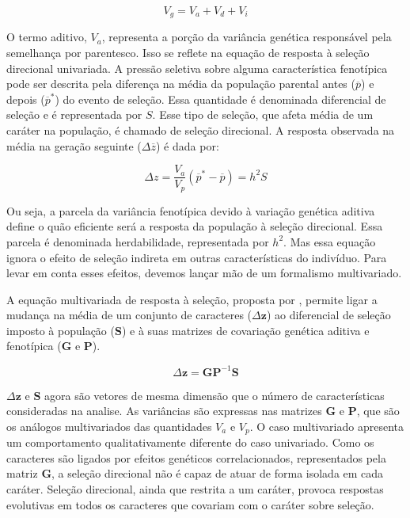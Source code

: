 \begin{equation}
    V_g = V_a + V_d + V_{i}
    \label{compgen}
\end{equation}

O termo aditivo, $V_a$, representa a porção da variância genética
responsável pela semelhança por parentesco.
Isso se reflete na equação de resposta à seleção direcional univariada.
A pressão seletiva sobre alguma característica fenotípica pode ser descrita
pela diferença na média da população parental antes ($\overline p$) e depois
($\overline p^*$) do evento de seleção.
Essa quantidade é denominada diferencial de seleção e é representada por
$S$.
Esse tipo de seleção, que afeta média de um caráter na população, é
chamado de seleção direcional.
A resposta observada na média na geração seguinte ($\Delta \overline z$) é dada
por:

\begin{equation}
    \Delta z = \frac{V_a}{V_p} (\overline p^* - \overline p) = h^2S
\end{equation}

Ou seja, a parcela da variância fenotípica devido à variação genética
aditiva define o quão eficiente será a resposta da população à seleção
direcional.
Essa parcela é denominada herdabilidade, representada por $h^2$.
Mas essa equação ignora o efeito de seleção indireta em outras
características do indivíduo.
Para levar em conta esses efeitos, devemos
lançar mão de um formalismo multivariado.

A equação multivariada de resposta à seleção,
proposta por \cite{Lande1979}, permite ligar a mudança na média de um
conjunto de caracteres ($\Delta \mathbf{z}$) ao diferencial de seleção imposto à população
($\mathbf{S}$) e à suas matrizes de covariação genética aditiva e fenotípica
($\mathbf{G}$ e $\mathbf{P}$).

\begin{equation}
    \Delta \mathbf{z} = \mathbf{GP}^{-1}\mathbf{S}
    \label{landeZGS}
\end{equation}
 
$\Delta \mathbf{z}$ e $\mathbf{S}$ agora são vetores de mesma dimensão que o número
de características consideradas na analise.
As variâncias são expressas nas matrizes $\mathbf{G}$ e $\mathbf{P}$, que são os análogos
multivariados das quantidades $V_a$ e $V_p$.
O caso multivariado apresenta um comportamento qualitativamente
diferente do caso univariado.
Como os caracteres são ligados por efeitos genéticos correlacionados,
representados pela matriz $\mathbf{G}$, a seleção direcional não é capaz de atuar de
forma isolada em cada caráter.
Seleção direcional, ainda que restrita a um caráter, provoca respostas
evolutivas em todos os caracteres que covariam com o caráter sobre
seleção.

